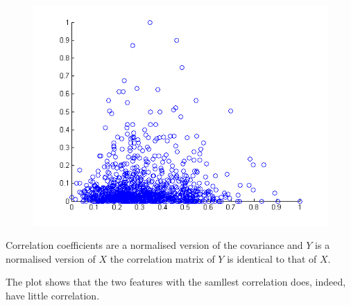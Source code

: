 \documentclass{article}
\begin{document}
\begin{figure}[H]
\centering
\includegraphics[scale=0.7]{fig22.png}
\end{figure}

Correlation coefficients are a normalised version of the covariance and $Y$ is
a normalised version of $X$ the correlation matrix of $Y$ is identical to that
of $X$.

The plot shows that the two features with the samllest correlation does,
indeed, have little correlation.
\end{document}
